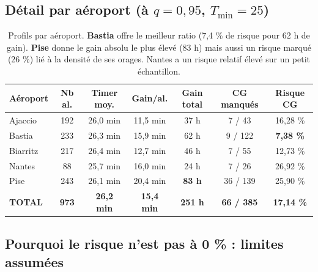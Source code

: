 \documentclass[11pt,a4paper]{article}
\begin{document}
\subsection{Détail par aéroport (à $q = 0{,}95$, $T_{\min} = 25$)}

\begin{table}[H]
\centering
\small
\begin{tabular}{lcccccc}
\toprule
\textbf{Aéroport} & \textbf{Nb al.} & \textbf{Timer moy.} & \textbf{Gain/al.} & \textbf{Gain total} & \textbf{CG manqués} & \textbf{Risque CG} \\
\midrule
Ajaccio  & 192 & 26,0 min & 11,5 min & 37 h & 7 / 43   & 16,28 \% \\
Bastia   & 233 & 26,3 min & 15,9 min & 62 h & 9 / 122  & \textbf{ 7,38 \%} \\
Biarritz & 217 & 26,4 min & 12,7 min & 46 h & 7 / 55   & 12,73 \% \\
Nantes   &  88 & 25,7 min & 16,0 min & 24 h & 7 / 26   & 26,92 \% \\
Pise     & 243 & 26,1 min & 20,4 min & \textbf{83 h} & 36 / 139 & 25,90 \% \\
\midrule
\textbf{TOTAL} & \textbf{973} & \textbf{26,2 min} & \textbf{15,4 min} & \textbf{251 h} & \textbf{66 / 385} & \textbf{17,14 \%} \\
\bottomrule
\end{tabular}
\caption{Profils par aéroport. \textbf{Bastia} offre le meilleur ratio (7,4 \% de risque pour
62 h de gain). \textbf{Pise} donne le gain absolu le plus élevé (83 h) mais aussi un risque
marqué (26 \%) lié à la densité de ses orages. Nantes a un risque relatif élevé sur un petit
échantillon.}
\label{tab:by_airport}
\end{table}

\subsection{Pourquoi le risque n'est pas à 0 \% : limites assumées}
\end{document}
